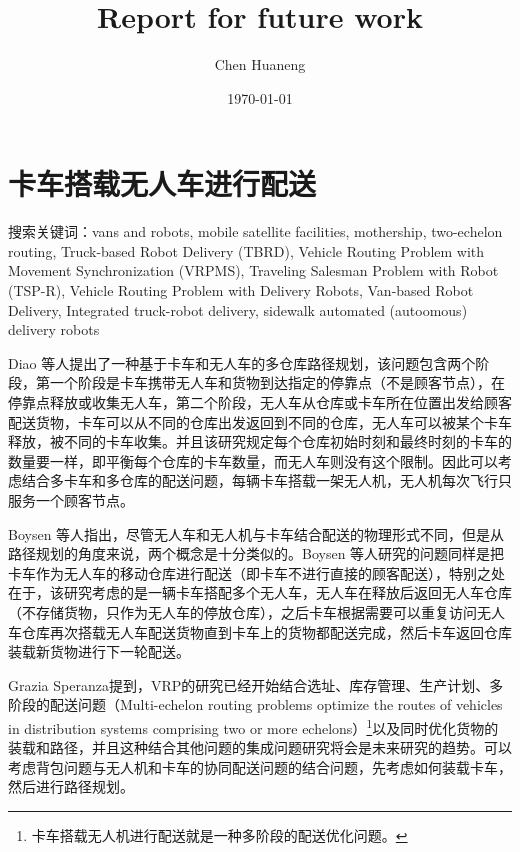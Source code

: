 \documentclass[fontset=none]{ctexart}
\title{Report for future work}
\author{Chen Huaneng}
\date{\today}
\begin{document}
\maketitle

\section{卡车搭载无人车进行配送}

\begin{note*}
	搜索关键词：vans and robots, mobile satellite facilities, mothership, two-echelon routing, Truck-based Robot Delivery (TBRD), Vehicle Routing Problem with Movement Synchronization (VRPMS),  Traveling Salesman Problem with Robot (TSP-R), Vehicle Routing Problem with Delivery Robots, Van-based Robot Delivery, Integrated truck-robot delivery, sidewalk automated (autoomous) delivery robots
\end{note*}

Diao 等人\cite{diaoMultidepotRoutingProblem2024}提出了一种基于卡车和无人车的多仓库路径规划，该问题包含两个阶段，第一个阶段是卡车携带无人车和货物到达指定的停靠点（不是顾客节点），在停靠点释放或收集无人车，第二个阶段，无人车从仓库或卡车所在位置出发给顾客配送货物，卡车可以从不同的仓库出发返回到不同的仓库，无人车可以被某个卡车释放，被不同的卡车收集。并且该研究规定每个仓库初始时刻和最终时刻的卡车的数量要一样，即平衡每个仓库的卡车数量，而无人车则没有这个限制。因此可以考虑结合多卡车和多仓库的配送问题，每辆卡车搭载一架无人机，无人机每次飞行只服务一个顾客节点。

Boysen 等人\cite{boysenSchedulingLastmileDeliveries2018}指出，尽管无人车和无人机与卡车结合配送的物理形式不同，但是从路径规划的角度来说，两个概念是十分类似的。Boysen 等人\cite{boysenSchedulingLastmileDeliveries2018}研究的问题同样是把卡车作为无人车的移动仓库进行配送（即卡车不进行直接的顾客配送），特别之处在于，该研究考虑的是一辆卡车搭配多个无人车，无人车在释放后返回无人车仓库（不存储货物，只作为无人车的停放仓库），之后卡车根据需要可以重复访问无人车仓库再次搭载无人车配送货物直到卡车上的货物都配送完成，然后卡车返回仓库装载新货物进行下一轮配送。

Grazia Speranza\cite{graziasperanzaTrendsTransportationLogistics2018}提到，VRP的研究已经开始结合选址、库存管理、生产计划、多阶段的配送问题（Multi-echelon routing problems optimize the routes of vehicles in distribution systems comprising two or more echelons）\footnote{卡车搭载无人机进行配送就是一种多阶段的配送优化问题。}以及同时优化货物的装载和路径，并且这种结合其他问题的集成问题研究将会是未来研究的趋势。可以考虑背包问题与无人机和卡车的协同配送问题的结合问题，先考虑如何装载卡车，然后进行路径规划。
\end{document}
